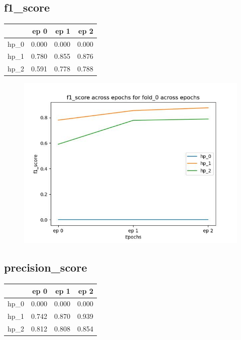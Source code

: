 \documentclass{article}
\begin{document}
\subsection{f1\_score}
\begin{tabular}{lrrr}
\toprule
{} &   ep 0 &   ep 1 &   ep 2 \\
\midrule
hp\_0 &  0.000 &  0.000 &  0.000 \\
hp\_1 &  0.780 &  0.855 &  0.876 \\
hp\_2 &  0.591 &  0.778 &  0.788 \\
\bottomrule
\end{tabular}

\begin{figure}[H]
\includegraphics[scale = 0.75]{fold_0/f1_score}
\end{figure}
\subsection{precision\_score}
\begin{tabular}{lrrr}
\toprule
{} &   ep 0 &   ep 1 &   ep 2 \\
\midrule
hp\_0 &  0.000 &  0.000 &  0.000 \\
hp\_1 &  0.742 &  0.870 &  0.939 \\
hp\_2 &  0.812 &  0.808 &  0.854 \\
\bottomrule
\end{tabular}
\end{document}
